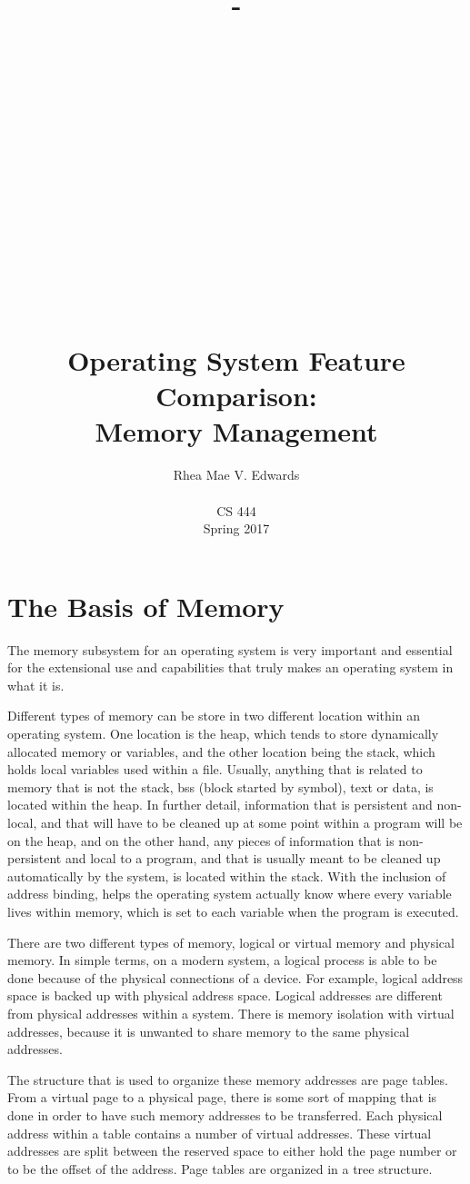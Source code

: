 \documentclass[letterpaper,10pt,onecolumn]{IEEEtran}
\title{-\\ ~ \\ ~ \\ ~ \\ ~ \\ ~ \\ ~ \\ ~ \\ ~ \\ ~ \\ Operating System Feature Comparison: \\Memory Management}
\author{Rhea Mae V. Edwards\\ ~ \\CS 444\\Spring 2017}
\begin{document}
\maketitle
\newpage

\section*{The Basis of Memory}
\par
The memory subsystem for an operating system is very important and essential for the extensional use and capabilities that truly makes an operating system in what it is. 
\par
Different types of memory can be store in two different location within an operating system. One location is the heap, which tends to store dynamically allocated memory or variables, and the other location being the stack, which holds local variables used within a file. Usually, anything that is related to memory that is not the stack, bss (block started by symbol), text or data, is located within the heap. In further detail, information that is persistent and non-local, and that will have to be cleaned up at some point within a program will be on the heap, and on the other hand, any pieces of information that is non-persistent and local to a program, and that is usually meant to be cleaned up automatically by the system, is located within the stack. With the inclusion of address binding, helps the operating system actually know where every variable lives within memory, which is set to each variable when the program is executed.
\par
There are two different types of memory, logical or virtual memory and physical memory. In simple terms, on a modern system, a logical process is able to be done because of the physical connections of a device. For example, logical address space is backed up with physical address space. Logical addresses are different from physical addresses within a system. There is memory isolation with virtual addresses, because it is unwanted to share memory to the same physical addresses.
\par
The structure that is used to organize these memory addresses are page tables. From a virtual page to a physical page, there is some sort of mapping that is done in order to have such memory addresses to be transferred. Each physical address within a table contains a number of virtual addresses. These virtual addresses are split between the reserved space to either hold the page number or to be the offset of the address. Page tables are organized in a tree structure. 
\end{document}
